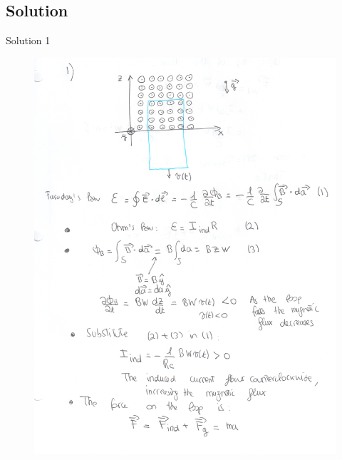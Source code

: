 \documentclass[solutions]{esg8022pset}
\begin{document}
\subsection{Solution}
  Solution 1
  \begin{figure}[H]
    \centering
    \includegraphics[width = 25cm]{ps9_1a}
  \end{figure}
\end{document}
